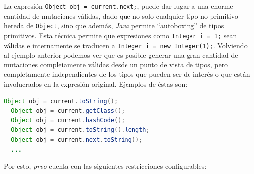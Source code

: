 La expresi\'on \lstinline|Object obj = current.next;|, puede dar lugar a una enorme cantidad de mutaciones v\'alidas, dado que no solo cualquier tipo no primitivo hereda de \texttt{Object}, sino que adem\'as, \emph{Java} permite ``autoboxing'' de tipos primitivos. Esta t\'ecnica permite que expresiones como \lstinline|Integer i = 1;| sean v\'alidas e internamente se traducen a \lstinline|Integer i = new Integer(1);|. Volviendo al ejemplo anterior podemos ver que es posible generar una gran cantidad de mutaciones completamente v\'alidas desde un punto de vista de tipos, pero completamente independientes de los tipos que pueden ser de inter\'es o que est\'an involucrados en la expresi\'on original. Ejemplos de \'estas son:
\begin{lstlisting}[language=Java,basicstyle={}]
  Object obj = current.toString();
  Object obj = current.getClass();
  Object obj = current.hashCode();
  Object obj = current.toString().length;
  Object obj = current.next.toString();
  ...
\end{lstlisting}

Por esto, \emph{prvo} cuenta con las siguientes restricciones configurables:

